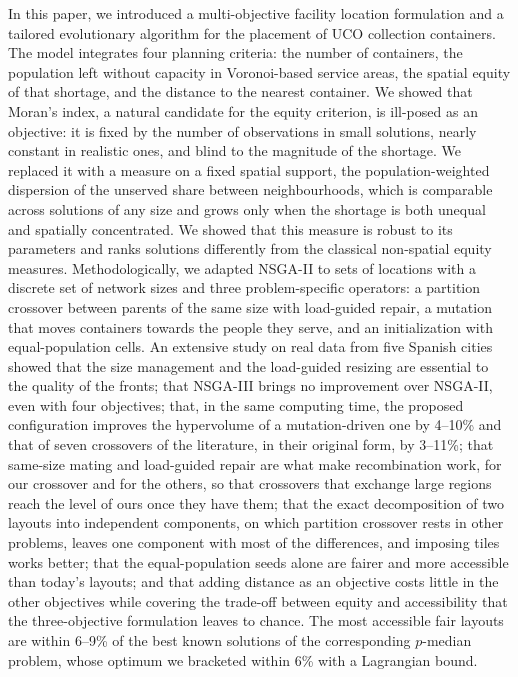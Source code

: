 In this paper, we introduced a multi-objective facility location formulation and a tailored evolutionary algorithm for the placement of UCO collection containers. The model integrates four planning criteria: the number of containers, the population left without capacity in Voronoi-based service areas, the spatial equity of that shortage, and the distance to the nearest container. We showed that Moran's index, a natural candidate for the equity criterion, is ill-posed as an objective: it is fixed by the number of observations in small solutions, nearly constant in realistic ones, and blind to the magnitude of the shortage. We replaced it with a measure on a fixed spatial support, the population-weighted dispersion of the unserved share between neighbourhoods, which is comparable across solutions of any size and grows only when the shortage is both unequal and spatially concentrated. We showed that this measure is robust to its parameters and ranks solutions differently from the classical non-spatial equity measures. Methodologically, we adapted NSGA-II to sets of locations with a discrete set of network sizes and three problem-specific operators: a partition crossover between parents of the same size with load-guided repair, a mutation that moves containers towards the people they serve, and an initialization with equal-population cells. An extensive study on real data from five Spanish cities showed that the size management and the load-guided resizing are essential to the quality of the fronts; that NSGA-III brings no improvement over NSGA-II, even with four objectives; that, in the same computing time, the proposed configuration improves the hypervolume of a mutation-driven one by 4--10\% and that of seven crossovers of the literature, in their original form, by 3--11\%; that same-size mating and load-guided repair are what make recombination work, for our crossover and for the others, so that crossovers that exchange large regions reach the level of ours once they have them; that the exact decomposition of two layouts into independent components, on which partition crossover rests in other problems, leaves one component with most of the differences, and imposing tiles works better; that the equal-population seeds alone are fairer and more accessible than today's layouts; and that adding distance as an objective costs little in the other objectives while covering the trade-off between equity and accessibility that the three-objective formulation leaves to chance. The most accessible fair layouts are within 6--9\% of the best known solutions of the corresponding $p$-median problem, whose optimum we bracketed within 6\% with a Lagrangian bound.

